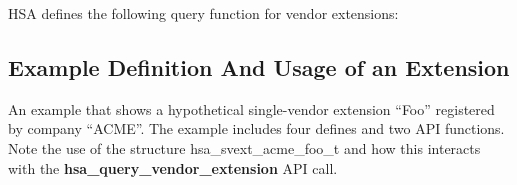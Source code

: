 \documentclass[draft]{book}
\newcommand{\diffblock}[1]{#1}
\newcommand{\reffun}[1]{\textbf{#1}}
\newcommand{\reftyp}[1]{#1}
\begin{document}
HSA defines the following query function for vendor extensions:



\subsection{Example Definition And Usage of an Extension}
An example that shows a hypothetical single-vendor extension ``Foo'' registered
by company ``ACME''. The example includes four defines and two API functions.
Note the use of the structure \reftyp{hsa_svext_acme_foo_t} and how this
interacts with the \reffun{hsa_query_vendor_extension} API call.



%
%
%
\end{document}
